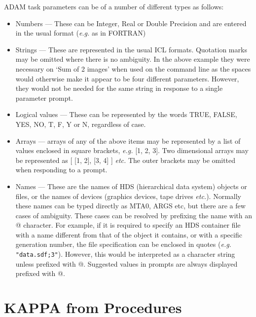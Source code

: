 \documentclass[twoside,11pt]{report}
\newcommand{\xlabel}[1]{}
\begin{document}
ADAM task parameters can be of a number of different types as follows:

\begin{itemize}

\item Numbers --- These can be Integer, Real or Double Precision and are
entered in the usual format ({\em e.g.} as in FORTRAN)

\item Strings --- These are represented in the usual ICL formats. Quotation
marks may be omitted where there is no ambiguity. In the above example they
were necessary on `Sum of 2 images' when used on the command line as the spaces
would otherwise make it appear to be four different parameters. However, they
would not be needed for the same string in response to a single parameter
prompt.

\item Logical values --- These can be represented by the words TRUE, FALSE,
YES, NO, T, F, Y or N, regardless of case.

\item Arrays --- arrays of any of the above items may be represented by
a list of values enclosed in square brackets, {\em e.g.} [1, 2, 3].
Two dimensional arrays may be represented as [ [1, 2], [3, 4] ] {\em etc.}
The outer brackets may be omitted when responding to a prompt.

\item Names --- These are the names of HDS (hierarchical data system) objects
or files, or the names of devices (graphics devices, tape drives {\em etc.}).
Normally these names can be typed directly as MTA0, ARGS etc, but there
are a few cases of ambiguity.
These cases can be resolved by prefixing the name with an @ character.
For example, if it is required to specify an HDS container file with a name
different from that of the object it contains, or with a specific generation
number, the file specification can be enclosed in quotes
({\em e.g.} \verb+"data.sdf;3"+).
However, this would be interpreted as a character string unless prefixed with
@.
Suggested values in prompts are always displayed prefixed with @.

\end{itemize}

\section{\xlabel{kappa_from_procedures}KAPPA from Procedures}
\end{document}
